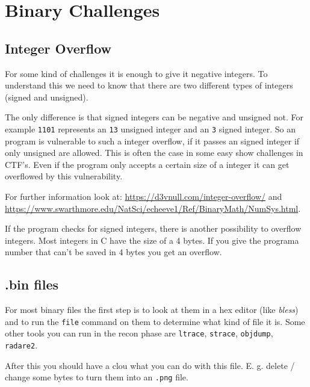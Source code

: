 
\section{Binary Challenges}

\subsection{Integer Overflow} For some kind of challenges it is enough to give it negative integers. To understand  this we need to know that there are two different types of integers (signed and unsigned).

The only difference is that signed integers can be negative and unsigned not. For example \texttt{1101} represents an \texttt{13} unsigned integer and an \texttt{3} signed integer. So an program is vulnerable to such a integer overflow, if it passes an signed integer if only unsigned are allowed. This is often the case in some easy show challenges in CTF's. Even if the program only accepts a certain size of a integer it can get overflowed by this vulnerability.

For further information look at: \url{https://d3vnull.com/integer-overflow/} and \url{https://www.swarthmore.edu/NatSci/echeeve1/Ref/BinaryMath/NumSys.html}.

If the program checks for signed integers, there is another possibility to overflow integers. Most integers in C have the size of a 4 bytes. If you give the programa number that can't be saved in 4 bytes you get an overflow.

\subsection{.bin files} For most binary files the first step is to look at them in a hex editor (like \emph{bless}) and to run the \texttt{file} command on them to determine what kind of file it is. Some other tools you can run in the recon phase are \texttt{ltrace}, \texttt{strace}, \texttt{objdump}, \texttt{radare2}.

After this you should have a clou what you can do with this file. E. g. delete / change some bytes to turn them into an \texttt{.png} file.